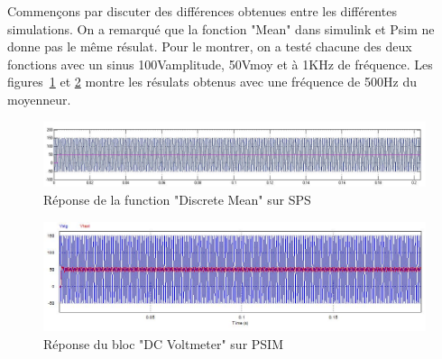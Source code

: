 \documentclass[11pt,letterpaper,final]{report}
\begin{document}
Commençons par discuter des différences obtenues entre les différentes simulations. On a remarqué que la fonction "Mean" dans simulink et Psim ne donne pas le même résulat. Pour le montrer, on a testé chacune des deux fonctions avec un sinus 100Vamplitude, 50Vmoy et à 1KHz de fréquence. Les figures~\ref{dis_mean} et \ref{D_mean} montre les résulats obtenus avec une fréquence de 500Hz du moyenneur.



\begin{figure}[h]
\centering
\includegraphics[scale=0.5]{fig/moy_sim.jpg}
\caption{Réponse de la function "Discrete Mean" sur SPS}
\label{dis_mean}
\end{figure}

\begin{figure}[h]
\centering
\includegraphics[scale=0.5]{fig/moy_psim.jpg}
\caption{Réponse du bloc "DC Voltmeter" sur PSIM}
\label{D_mean}
\end{figure}
\end{document}
